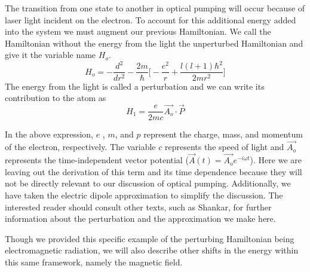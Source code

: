 \documentclass[letter,12pt]{article}
\begin{document}
		The transition from one state to another in optical pumping
		will occur because of laser light incident on the electron.
		To account for this additional energy added into the system 
		we must augment
		our previous Hamiltonian. We call the Hamiltonian without 
		the energy from the light the unperturbed Hamiltonian and 
		give it the variable name $H_o$.
		\begin{equation}
			H_o=-\frac{d^2}{dr^2}-\frac{2m}{\hbar}\Big[-\frac{e^2}{r} + \frac{l(l+1)\hbar^2}{2mr^2}\Big]
		\end{equation}
		The energy from the light is called a perturbation and we
		can write its contribution to the atom as 
		\begin{equation}
			H_1=\frac{e}{2mc} \vec{A_o} \cdotp \vec{P}
		\end{equation}

		In the above expression, $e$ , $m$, and $p$ represent the charge, mass,
		and momentum of the electron, respectively. The variable $c$ represents
		the speed of light and $\vec{A_o}$ represents the time-independent 
		vector potential ($\vec{A}(t)=\vec{A_o}e^{-i\omega t}$). 
		Here we are leaving out the derivation of this term and
		its time dependence because they will not be directly 
		relevant to our discussion of optical pumping. Additionally, 
		we have taken the electric dipole approximation to simplify
		the discussion. 
		The interested reader should
		consult other texts, such as Shankar, for further information about the 
		perturbation and the approximation we make here. 

        Though we provided this specific example of the perturbing 
        Hamiltonian being electromagnetic radiation, we will also 
        describe other shifts in the energy within this same framework,
        namely the magnetic field.
\end{document}

